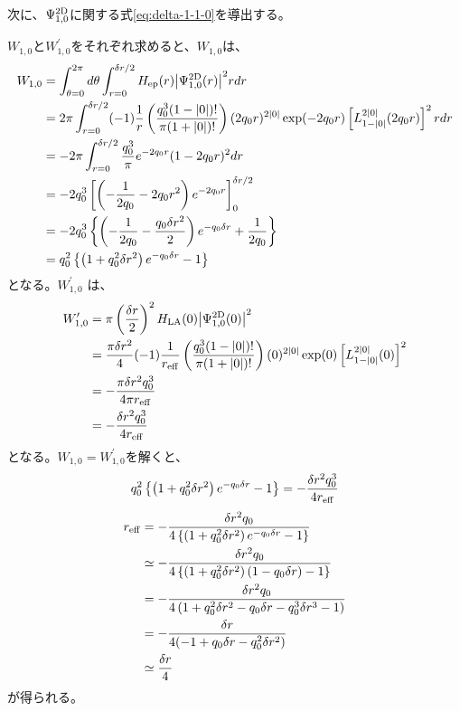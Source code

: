 \documentclass[wabun2025.tex]{subfiles}
\begin{document}
次に、$\Psi^{\mathrm{2D}}_{1,0}$に関する式\eqref{eq:delta-1-1-0}を導出する。

$W_{1,0}$と$W_{1,0}^\prime$をそれぞれ求めると、$W_{1,0}$は、
\begin{align}
  W_{1,0}
   &= \int_{\theta=0}^{2\pi}d\theta
      \int_{r=0}^{\delta r/2}H_{\mathrm{ep}}(r){\left| \Psi^{\mathrm{2D}}_{1,0}(r) \right|}^2r dr\notag\\
   &= 2\pi\int_{r=0}^{\delta r/2}
      (-1)\frac{1}{r}\left(\frac{q_0^3(1-{\left| 0 \right|})!}{\pi(1+{\left| 0 \right|})!}\right)
      (2q_0r)^{2{\left| 0 \right|}}\exp(-2q_0r)
      \left[L_{1-{\left| 0 \right|}}^{2{\left| 0 \right|}}(2q_0r)\right]^2 r dr\notag\\
   &= -2\pi\int_{r=0}^{\delta r/2}\frac{q_0^3}{\pi}e^{-2q_0r}(1-2q_0r)^2dr\notag\\
   &= -2q_0^3\left[\left(-\frac{1}{2q_0}-2q_0r^2\right)e^{-2q_0r}\right]_{0}^{\delta r/2} \notag\\
   &= -2q_0^3\left\{\left(-\frac{1}{2q_0}-\frac{q_0\delta r^2}{2}\right)e^{-q_0\delta r}+\frac{1}{2q_0}\right\}\notag\\
   &= q_0^2\left\{\left(1+q_0^2\delta r^2\right)e^{-q_0\delta r}-1\right\}
\end{align}
となる。$W_{1,0}^\prime$ は、
\begin{align}
    W_{1,0}^\prime
    &=\pi\left(\frac{\delta r}{2}\right)^2
         H_{\mathrm{LA}}(0){\left| \Psi^{\mathrm{2D}}_{1,0}(0) \right|}^2\notag\\
    &=\frac{\pi\delta r^2}{4}(-1)\frac{1}{r_{\mathrm{eff}}}
    \left(\frac{q_0^3(1-{\left| 0 \right|})!}{\pi(1+{\left| 0 \right|})!}\right)
    (0)^{2{\left| 0 \right|}}\exp(0)\left[L_{1-{\left| 0 \right|}}^{2{\left| 0 \right|}}(0)\right]^2\notag\\
    &= -\frac{\pi\delta r^2q_0^3}{4\pi r_{\mathrm{eff}}}\notag\\
    &= -\frac{\delta r^2q_0^3}{4r_{\mathrm{eff}}}
\end{align}
となる。$W_{1,0}=W_{1,0}^\prime$を解くと、
\begin{equation}
q_0^2\left\{\left(1+q_0^2\delta r^2\right)e^{-q_0\delta r}-1\right\}
=-\frac{\delta r^2q_0^3}{4r_{\mathrm{eff}}}
\end{equation}
\begin{align}
r_{\mathrm{eff}}&=-\frac{\delta r^2q_0}{4\left\{\left(1+q_0^2\delta r^2\right)e^{-q_0\delta r}-1\right\}}\notag\\
&\simeq-\frac{\delta r^2q_0}{4\left\{\left(1+q_0^2\delta r^2\right)(1-q_0\delta r)-1\right\}}\notag\\
&=-\frac{\delta r^2q_0}{4\left(1+q_0^2\delta r^2-q_0\delta r-q_0^3\delta r^3-1\right)}\notag\\
&=-\frac{\delta r}{4(-1+q_0\delta r-q_0^2\delta r^2)}\notag\\
&\simeq\frac{\delta r}{4}
\end{align}
が得られる。
\end{document}
